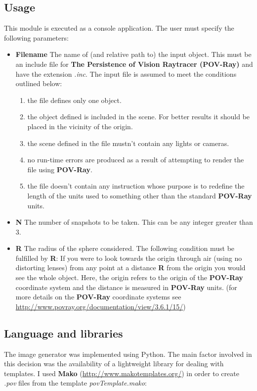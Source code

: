 \documentclass[12pt,a4paper,twoside,openright]{report}
\begin{document}
\subsection{Usage}
This module is executed as a console application. The user must specify the following parameters:
\begin{itemize}
\item \textbf{Filename} The name of (and relative path to) the input object. This must be an include file for \textbf{The Persistence of Vision Raytracer (POV-Ray)} and have the extension \textit{.inc}. The input file is assumed to meet the conditions outlined below:
	\begin{enumerate}
		\item the file defines only one object.
		\item the object defined is included in the scene. For better results it should be placed in the vicinity of the origin.
		\item the scene defined in the file mustn't contain any lights or cameras.
		\item no run-time errors are produced as a result of attempting to render the file using \textbf{POV-Ray}. 
		\item the file doesn't contain any instruction whose purpose is to redefine the length of the units used to something other than the standard \textbf{POV-Ray} units. 
	\end{enumerate}    
\item \textbf{N} The number of snapshots to be taken. This can be any integer greater than 3.
\item \textbf{R} The radius of the sphere considered. The following condition must be fulfilled by \textbf{R}: If you were to look towards the origin through air (using no distorting lenses) from any point at a distance \textbf{R} from the origin you would see the whole object. Here, the origin refers to the origin of the \textbf{POV-Ray} coordinate system and the distance is measured in \textbf{POV-Ray} units.  (for more details on the \textbf{POV-Ray} coordinate systems see \url{http://www.povray.org/documentation/view/3.6.1/15/})
\end{itemize}


\subsection{Language and libraries}
The image generator was implemented using Python. The main factor involved in this decision was the availability of a lightweight library for dealing with templates. I used \textbf{Mako} (\url{http://www.makotemplates.org/}) in order to create \textit{.pov} files from the template \textit{povTemplate.mako}: 
\end{document}
